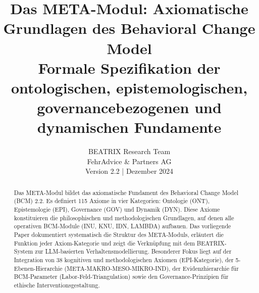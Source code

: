 \documentclass[11pt,a4paper]{article}
\title{%
    \Large \textbf{Das META-Modul: Axiomatische Grundlagen des Behavioral Change Model} \\[0.5em]
    \large Formale Spezifikation der ontologischen, epistemologischen, governancebezogenen und dynamischen Fundamente
}
\author{%
    BEATRIX Research Team \\
    FehrAdvice \& Partners AG \\[0.5em]
    \small Version 2.2 | Dezember 2024
}
\date{}
\theoremstyle{definition}
\theoremstyle{plain}
\newcommand{\BCM}{\textsc{BCM}}
\newcommand{\META}{\textsc{META}}
\newcommand{\BEATRIX}{\textsc{BEATRIX}}
\begin{document}
\maketitle

\begin{abstract}
Das \META-Modul bildet das axiomatische Fundament des Behavioral Change Model (\BCM) 2.2. Es definiert 115 Axiome in vier Kategorien: Ontologie (ONT), Epistemologie (EPI), Governance (GOV) und Dynamik (DYN). Diese Axiome konstituieren die philosophischen und methodologischen Grundlagen, auf denen alle operativen BCM-Module (INU, KNU, IDN, LAMBDA) aufbauen. Das vorliegende Paper dokumentiert systematisch die Struktur des \META-Moduls, erläutert die Funktion jeder Axiom-Kategorie und zeigt die Verknüpfung mit dem \BEATRIX-System zur LLM-basierten Verhaltensmodellierung. Besonderer Fokus liegt auf der Integration von 38 kognitiven und methodologischen Axiomen (EPI-Kategorie), der 5-Ebenen-Hierarchie (META-MAKRO-MESO-MIKRO-IND), der Evidenzhierarchie für BCM-Parameter (Labor-Feld-Triangulation) sowie den Governance-Prinzipien für ethische Interventionsgestaltung.
\end{abstract}

\tableofcontents
\newpage



















\end{document}
